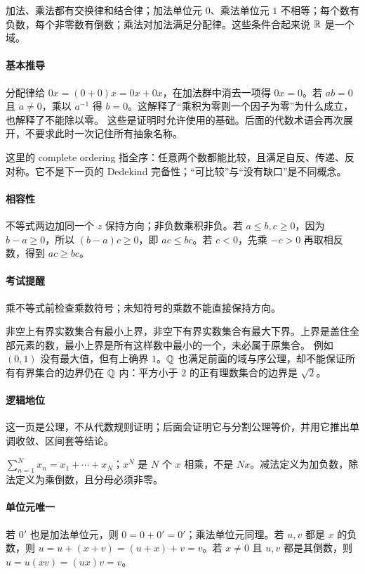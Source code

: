 加法、乘法都有交换律和结合律；加法单位元 $0$、乘法单位元 $1$ 不相等；每个数有负数，每个非零数有倒数；乘法对加法满足分配律。这些条件合起来说 $\mathbb{R}$ 是一个域。
\paragraph{基本推导}分配律给 $0x=(0+0)x=0x+0x$，在加法群中消去一项得 $0x=0$。若 $ab=0$ 且 $a\ne0$，乘以 $a^{-1}$ 得 $b=0$。这解释了“乘积为零则一个因子为零”为什么成立，也解释了不能除以零。
这些是证明时允许使用的基础。后面的代数术语会再次展开，不要求此时一次记住所有抽象名称。

这里的 complete ordering 指全序：任意两个数都能比较，且满足自反、传递、反对称。它不是下一页的 Dedekind 完备性；“可比较”与“没有缺口”是不同概念。
\paragraph{相容性}不等式两边加同一个 $z$ 保持方向；非负数乘积非负。若 $a\le b,c\ge0$，因为 $b-a\ge0$，所以 $(b-a)c\ge0$，即 $ac\le bc$。若 $c<0$，先乘 $-c>0$ 再取相反数，得到 $ac\ge bc$。
\paragraph{考试提醒}乘不等式前检查乘数符号；未知符号的乘数不能直接保持方向。

非空上有界实数集合有最小上界，非空下有界实数集合有最大下界。上界是盖住全部元素的数，最小上界是所有这样数中最小的一个，未必属于原集合。
例如 $(0,1)$ 没有最大值，但有上确界 $1$。$\mathbb{Q}$ 也满足前面的域与序公理，却不能保证所有有界集合的边界仍在 $\mathbb{Q}$ 内：平方小于 $2$ 的正有理数集合的边界是 $\sqrt2$。
\paragraph{逻辑地位}这一页是公理，不从代数规则证明；后面会证明它与分割公理等价，并用它推出单调收敛、区间套等结论。

$\sum_{n=1}^N x_n=x_1+\cdots+x_N$；$x^N$ 是 $N$ 个 $x$ 相乘，不是 $Nx$。减法定义为加负数，除法定义为乘倒数，且分母必须非零。
\paragraph{单位元唯一}若 $0'$ 也是加法单位元，则 $0=0+0'=0'$；乘法单位元同理。若 $u,v$ 都是 $x$ 的负数，则 $u=u+(x+v)=(u+x)+v=v$。若 $x\ne0$ 且 $u,v$ 都是其倒数，则 $u=u(xv)=(ux)v=v$。
